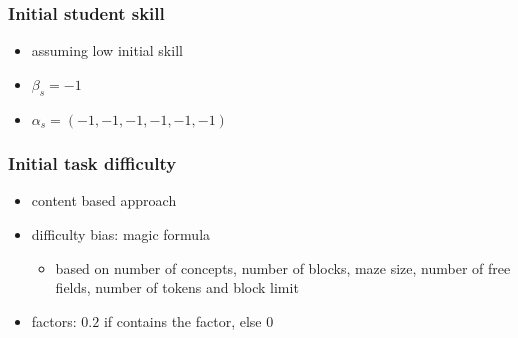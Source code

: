 \documentclass[xcolor=dvipsnames, 14pt]{beamer}
\begin{document}
\begin{frame}
\frametitle{Initial student skill}
\begin{itemize}
\item assuming low initial skill
\item $\beta_s = -1$
\item $\alpha_s = (-1, -1, -1, -1, -1, -1)$
\end{itemize}
\end{frame}

\begin{frame}
\frametitle{Initial task difficulty}
\begin{itemize}
\item content based approach
\item difficulty bias: magic formula
  \begin{itemize}
  \item based on number of concepts, number of blocks, maze size, number of free fields, number of tokens and block limit
  \end{itemize}
\item factors: $0.2$ if contains the factor, else $0$
\end{itemize}
\end{frame}

\end{document}
